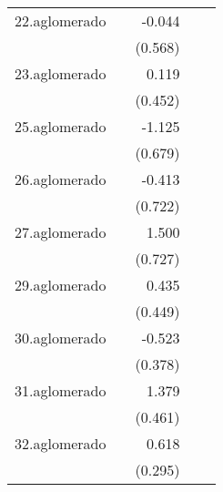 {\begin{longtable}{l*{4}{D{.}{.}{-1}}}
\addlinespace
22.aglomerado&                     &      -0.044         &                     &                     \\
            &                     &     (0.568)         &                     &                     \\
\addlinespace
23.aglomerado&                     &       0.119         &                     &                     \\
            &                     &     (0.452)         &                     &                     \\
\addlinespace
25.aglomerado&                     &      -1.125         &                     &                     \\
            &                     &     (0.679)         &                     &                     \\
\addlinespace
26.aglomerado&                     &      -0.413         &                     &                     \\
            &                     &     (0.722)         &                     &                     \\
\addlinespace
27.aglomerado&                     &       1.500\sym{*}  &                     &                     \\
            &                     &     (0.727)         &                     &                     \\
\addlinespace
29.aglomerado&                     &       0.435         &                     &                     \\
            &                     &     (0.449)         &                     &                     \\
\addlinespace
30.aglomerado&                     &      -0.523         &                     &                     \\
            &                     &     (0.378)         &                     &                     \\
\addlinespace
31.aglomerado&                     &       1.379\sym{**} &                     &                     \\
            &                     &     (0.461)         &                     &                     \\
\addlinespace
32.aglomerado&                     &       0.618\sym{*}  &                     &                     \\
            &                     &     (0.295)         &                     &                     \\

\end{longtable}}
